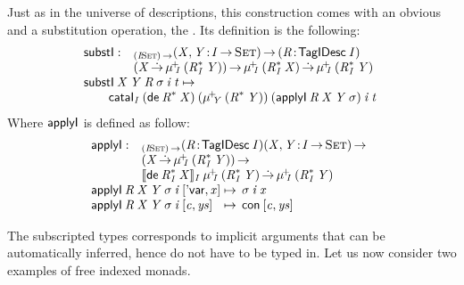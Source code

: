 Just as in the universe of descriptions, this construction comes with
an obvious \return and a substitution operation, the \bind. Its
definition is the following:
%
\[\stk{
\begin{array}{@{}ll}
\substI : & _{\PI{\V{I}}{\Set}}
            \PI{\V{X}, \V{Y}}{\V{I} \To \Set}
            \PITEL{\V{R}}{\TagIDesc{\V{I}}} \\
          & (\V{X} \DotTo 
             \muide{\V{I}}{(\FreeIMonad{\V{R}}{\V{I}}{\V{Y}})}) \To 
             \muide{\V{I}}{(\FreeIMonad{\V{R}}{\V{I}}{\V{X}})} \DotTo
             \muide{\V{I}}{(\FreeIMonad{\V{R}}{\V{I}}{\V{Y}})}
\end{array} \\
\substI\: \V{X}\: \V{Y}\: \V{R}\: \V{\sigma}\: \V{i}\: \V{t} \mapsto \\
\qquad    \cataI_{\V{I}}\: (\toIDesc{\FreeIMonad{\V{R}}{}{\V{X}}})\:
                      (\muide{\V{Y}}{(\FreeIMonad{\V{R}}{}{\V{Y}})})\:
                      (\F{applyI}\: \V{R}\: \V{X}\: \V{Y}\: \V{\sigma})\:
                      \V{i}\:
                      \V{t} 
}\]
% 
Where  $\F{applyI}$ is defined as follow:
%
\[\stk{
\begin{array}{@{}ll}
\F{applyI} : & _{\PI{\V{I}}{\Set}}
            \PITEL{\V{R}}{\TagIDesc{\V{I}}}
            \PI{\V{X}, \V{Y}}{\V{I} \To \Set} \\
          & (\V{X} \DotTo \muide{\V{I}}{(\FreeIMonad{\V{R}}{\V{I}}{\V{Y}})}{}) \To \\
          & \idescop{\toIDesc{\FreeIMonad{\V{R}}
                                         {\V{I}}
                                         {\V{X}}}}
                    {\V{I}}
                    {\muide{\V{I}}{(\FreeIMonad{\V{R}}{\V{I}}{\V{Y}})}} \DotTo 
            \muide{\V{I}}{(\FreeIMonad{\V{R}}{\V{I}}{\V{Y}})}{}
\end{array} \\
\begin{array}{@{}l@{\:\mapsto\:\:}l}
\F{applyI}\: \V{R}\: \V{X}\: \V{Y}\: \V{\sigma}\: \V{i}\: \pair{\SYMBDVar}{\V{x}}{}   & \V{\sigma}\: \V{i}\: \V{x}                   \\
\F{applyI}\: \V{R}\: \V{X}\: \V{Y}\: \V{\sigma}\: \V{i}\: \pair{\V{c}}{\V{ys}}{} & \Con{\pair{\V{c}}{\V{ys}}{}}
\end{array}
}\]
 
The subscripted types corresponds to implicit arguments that can be
automatically inferred, hence do not have to be typed in. Let us now
consider two examples of free indexed monads.


